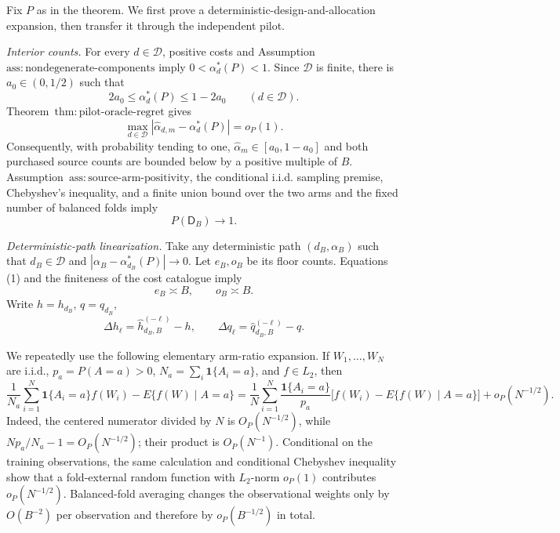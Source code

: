 Fix \(P\) as in the theorem.  We first prove a deterministic-design-and-allocation expansion, then transfer it through the independent pilot.

\emph{Interior counts.}
For every \(d\in\mathcal D\), positive costs and Assumption~\(\mathrm{ass{:}nondegenerate\text{-}components}\) imply \(0<\alpha_d^*(P)<1\).  Since \(\mathcal D\) is finite, there is \(a_0\in(0,1/2)\) such that
\[
 2a_0\le\alpha_d^*(P)\le1-2a_0
 \qquad(d\in\mathcal D).                                    \tag{1}
\]
Theorem~\(\mathrm{thm{:}pilot\text{-}oracle\text{-}regret}\) gives
\[
 \max_{d\in\mathcal D}
 |\widehat\alpha_{d,m}-\alpha_d^*(P)|=o_P(1).                 \tag{2}
\]
Consequently, with probability tending to one, \(\widehat\alpha_m\in[a_0,1-a_0]\) and both purchased source counts are bounded below by a positive multiple of \(B\).  Assumption~\(\mathrm{ass{:}source\text{-}arm\text{-}positivity}\), the conditional i.i.d. sampling premise, Chebyshev's inequality, and a finite union bound over the two arms and the fixed number of balanced folds imply
\[
 P(\mathsf D_B)\longrightarrow1.                              \tag{3}
\]

\emph{Deterministic-path linearization.}
Take any deterministic path \((d_B,\alpha_B)\) such that \(d_B\in\mathcal D\) and \(|\alpha_B-\alpha_{d_B}^*(P)|\to0\).  Let \(e_B,o_B\) be its floor counts.  Equations (1) and the finiteness of the cost catalogue imply
\[
 e_B\asymp B,\qquad o_B\asymp B.                             \tag{4}
\]
Write \(h=h_{d_B}\), \(q=q_{d_B}\),
\[
 \Delta h_\ell=\widehat h_{d_B,B}^{(-\ell)}-h,
 \qquad
 \Delta q_\ell=\widehat q_{d_B,B}^{(-\ell)}-q.
\]

We repeatedly use the following elementary arm-ratio expansion.  If \(W_1,\ldots,W_N\) are i.i.d., \(p_a=P(A=a)>0\), \(N_a=\sum_i\mathbf1\{A_i=a\}\), and \(f\in L_2\), then
\[
 \frac1{N_a}\sum_{i=1}^N\mathbf1\{A_i=a\}f(W_i)
 -E\{f(W)\mid A=a\}
 =\frac1N\sum_{i=1}^N\frac{\mathbf1\{A_i=a\}}{p_a}
 \bigl[f(W_i)-E\{f(W)\mid A=a\}\bigr]
 +o_P(N^{-1/2}).                                               \tag{5}
\]
Indeed, the centered numerator divided by \(N\) is \(O_P(N^{-1/2})\), while \(Np_a/N_a-1=O_P(N^{-1/2})\); their product is \(O_P(N^{-1})\).  Conditional on the training observations, the same calculation and conditional Chebyshev inequality show that a fold-external random function with \(L_2\)-norm \(o_P(1)\) contributes \(o_P(N^{-1/2})\).  Balanced-fold averaging changes the observational weights only by \(O(B^{-2})\) per observation and therefore by \(o_P(B^{-1/2})\) in total.

